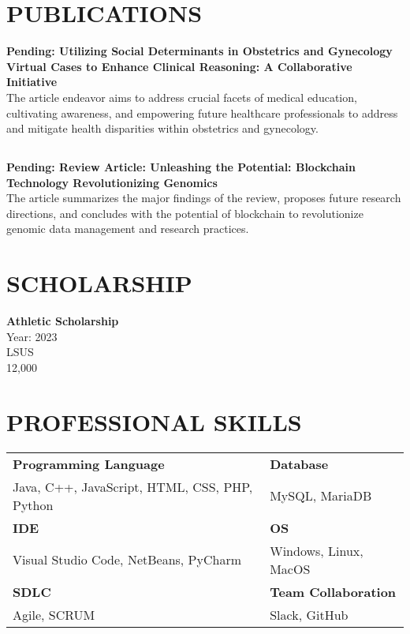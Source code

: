\documentclass[a4paper,9pt]{article}
\begin{document}
\section*{PUBLICATIONS}

\textbf{Pending: Utilizing Social Determinants in Obstetrics and Gynecology Virtual Cases to Enhance Clinical Reasoning: A Collaborative Initiative} \\
The article endeavor aims to address crucial facets of medical education, cultivating awareness, and empowering future healthcare professionals to address and mitigate health disparities within obstetrics and gynecology.

\subsection*{} 
\textbf{Pending: Review Article: Unleashing the Potential: Blockchain Technology Revolutionizing Genomics} \\
The article summarizes the major findings of the review, proposes future research directions, and concludes with the potential of blockchain to revolutionize genomic data management and research practices.


\section*{SCHOLARSHIP}

\noindent
\textbf{Athletic Scholarship} \\
Year: 2023 \\
LSUS \\
12,000

\section*{PROFESSIONAL SKILLS}

\noindent
\begin{tabular}{|p{}|p{}|}
\hline
\textbf{Programming Language} & \textbf{Database} \\
Java, C++, JavaScript, HTML, CSS, PHP, Python & MySQL, MariaDB \\
\hline
\textbf{IDE} & \textbf{OS} \\
Visual Studio Code, NetBeans, PyCharm & Windows, Linux, MacOS \\
\hline
\textbf{SDLC} & \textbf{Team Collaboration} \\
Agile, SCRUM & Slack, GitHub \\
\hline
\end{tabular}
\end{document}
